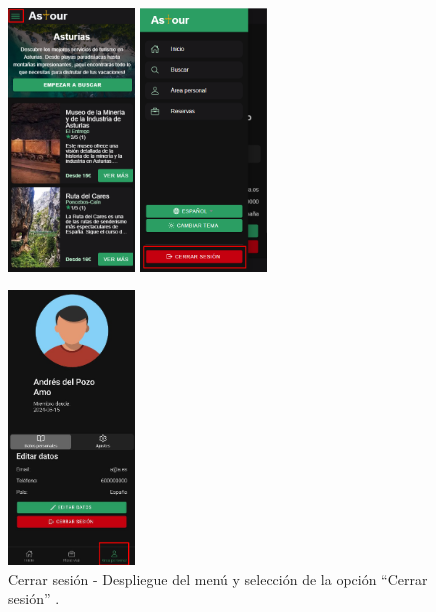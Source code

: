 \begin{figure}[H]
	\centering
	\begin{minipage}{0.45\textwidth}
		\centering
		\includegraphics[width=0.3\textwidth]{7-Construccion/Manuales/mobile/menu marcado.png}
		\includegraphics[width=0.3\textwidth]{7-Construccion/Manuales/mobile/cerrar sesion marcado.png}
		\caption{Cerrar sesión - Despliegue del menú y selección de la opción “Cerrar sesión” .}
		\label{fig:cuenta-movil}
	\end{minipage}
	\hfill
	\begin{minipage}{0.45\textwidth}
		\centering
		\includegraphics[width=0.3\textwidth]{7-Construccion/Manuales/app/P1-Perfil.png}

\end{minipage}
\end{figure}
